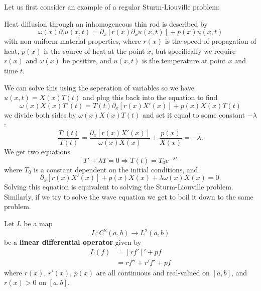 
Let us first consider an example of a regular
Sturm-Liouville problem:
\begin{ex}
Heat diffusion through an inhomogeneous thin rod is
described by
\begin{equation}
\omega(x)\partial_{t}u(x,t) =
\partial_{x}[r(x)\partial_{x}u(x,t)] + p(x)u(x,t)
\end{equation}
with non-uniform material properties, where $r(x)$ is the
speed of propagation of heat, $p(x)$ is the source of heat
at the point $x$, but specifically we require $r(x)$ and
$\omega(x)$ be positive, and $u(x,t)$ is the temperature at
point $x$ and time $t$.
\end{ex}

We can solve this using the seperation of
variables
so we have $u(x,t)=X(x)T(t)$ and plug this back into the
equation to find
\begin{equation}
\omega(x)X(x)T'(t)=T(t)\partial_{x}[r(x)X'(x)]+p(x)X(x)T(t)
\end{equation}
we divide both sides by $\omega(x)X(x)T(t)$ and set it equal
to some constant $-\lambda$:
\begin{equation}
\frac{T'(t)}{T(t)} = \frac{\partial_{x}[r(x)X'(x)]}{\omega(x)X(x)}+\frac{p(x)}{X(x)}=-\lambda.
\end{equation}
We get two equations
\begin{equation}
T'+\lambda T=0\Rightarrow T(t)=T_{0}e^{-\lambda t}
\end{equation}
where $T_{0}$ is a constant dependent on the initial
conditions, and
\begin{equation}\label{eq:25April2008:sturmLiouville}
\partial_{x}[r(x)X'(x)]+p(x)X(x)+\lambda\omega(x)X(x)=0.
\end{equation}
Solving this equation is equivalent to solving the
Sturm-Liouville problem. Similarly, if we try to solve the
wave equation we get to boil it down to the same problem.

\begin{defn}
Let $L$ be a map
\begin{equation*}
L: C^{2}(a,b)\to L^{2}(a,b)
\end{equation*}
be a \textbf{linear differential operator} given by
\begin{align*}
L(f) &= [rf']' + pf\\
&= rf''+r'f' + pf
\end{align*}
where $r(x)$, $r'(x)$, $p(x)$ are all continuous and
real-valued on $[a,b]$, and $r(x)>0$ on $[a,b]$.
\end{defn}

